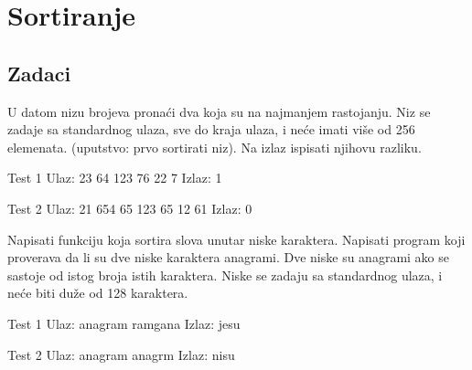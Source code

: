 \chapter{Sortiranje}

\section{Zadaci}

\begin{Exercise}[label=501]
  U datom nizu brojeva prona\'ci dva koja su na najmanjem
  rastojanju. Niz se zadaje sa standardnog ulaza, sve do kraja ulaza,
  i ne\' ce imati vi\v se od 256 elemenata. (uputstvo: prvo sortirati
  niz). Na izlaz ispisati njihovu razliku.
  
  \begin{miditest}
    \begin{test}{Test 1}
      Ulaz:   23 64 123 76 22 7
      Izlaz:  1
    \end{test}
  \end{miditest}
  
  \begin{miditest}
    \begin{test}{Test 2}
      Ulaz:   21 654 65 123 65 12 61
      Izlaz:  0
    \end{test}
  \end{miditest}
  
\end{Exercise}

\begin{Answer}[ref=501]
\end{Answer}
\begin{Exercise}[label=502]
  Napisati funkciju koja sortira slova unutar niske
  karaktera. Napisati program koji proverava da li su dve niske
  karaktera anagrami. Dve niske su anagrami ako se sastoje od istog
  broja istih karaktera. Niske se zadaju sa standardnog ulaza, i ne\'
  ce biti du\v ze od 128 karaktera.
  
  \begin{miditest}
    \begin{test}{Test 1}
      Ulaz:   anagram ramgana
      Izlaz:  jesu
    \end{test}
  \end{miditest}
  \begin{miditest}
    \begin{test}{Test 2}
      Ulaz:   anagram anagrm
      Izlaz:  nisu
    \end{test}
  \end{miditest}
  
\end{Exercise}


